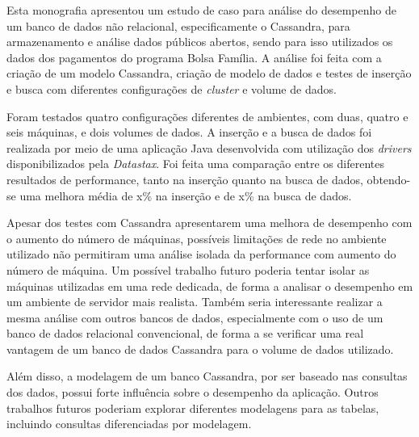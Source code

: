 Esta monografia apresentou um estudo de caso para análise do desempenho de um banco de dados não relacional, especificamente o Cassandra, para armazenamento e análise dados públicos abertos, sendo para isso utilizados os dados dos pagamentos do programa Bolsa Família. A análise foi feita com a criação de um modelo Cassandra, criação de modelo de dados e testes de inserção e busca com diferentes configurações de \emph{cluster} e volume de dados.

Foram testados quatro configurações diferentes de ambientes, com duas, quatro e seis máquinas, e dois volumes de dados. A inserção e a busca de dados foi realizada por meio de uma aplicação Java desenvolvida com utilização dos \emph{drivers} disponibilizados pela \emph{Datastax}. Foi feita uma comparação entre os diferentes resultados de performance, tanto na inserção quanto na busca de dados, obtendo-se uma melhora média de x\% na inserção e de x\% na busca de dados.

Apesar dos testes com Cassandra apresentarem uma melhora de desempenho com o aumento do número de máquinas, possíveis limitações de rede no ambiente utilizado não permitiram uma análise isolada da performance com aumento do número de máquina. Um possível trabalho futuro poderia tentar isolar as máquinas utilizadas em uma rede dedicada, de forma a analisar o desempenho em um ambiente de servidor mais realista. Também seria interessante realizar a mesma análise com outros bancos de dados, especialmente com o uso de um banco de dados relacional convencional, de forma a se verificar uma real vantagem de um banco de dados Cassandra para o volume de dados utilizado.

Além disso, a modelagem de um banco Cassandra, por ser baseado nas consultas dos dados, possui forte influência sobre o desempenho da aplicação. Outros trabalhos futuros poderiam explorar diferentes modelagens para as tabelas, incluindo consultas diferenciadas por modelagem.